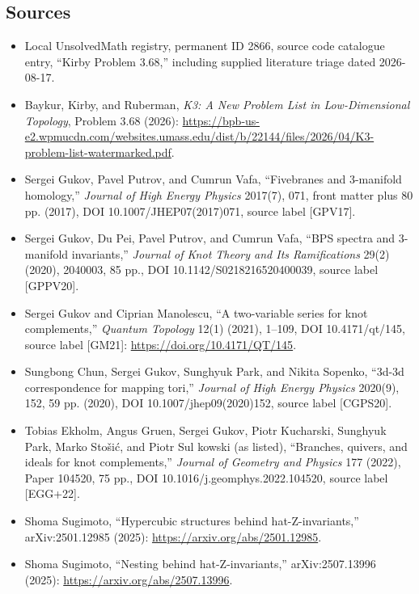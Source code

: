 \documentclass[11pt]{article}
\begin{document}
\subsection{Sources}
\begin{itemize}
\item Local UnsolvedMath registry, permanent ID 2866, source code catalogue entry, ``Kirby Problem 3.68,'' including supplied literature triage dated 2026-08-17.
\item Baykur, Kirby, and Ruberman, \emph{K3: A New Problem List in Low-Dimensional Topology}, Problem 3.68 (2026): \url{https://bpb-us-e2.wpmucdn.com/websites.umass.edu/dist/b/22144/files/2026/04/K3-problem-list-watermarked.pdf}.
\item Sergei Gukov, Pavel Putrov, and Cumrun Vafa, ``Fivebranes and 3-manifold homology,'' \emph{Journal of High Energy Physics} 2017(7), 071, front matter plus 80 pp. (2017), DOI 10.1007/JHEP07(2017)071, source label [GPV17].
\item Sergei Gukov, Du Pei, Pavel Putrov, and Cumrun Vafa, ``BPS spectra and 3-manifold invariants,'' \emph{Journal of Knot Theory and Its Ramifications} 29(2) (2020), 2040003, 85 pp., DOI 10.1142/S0218216520400039, source label [GPPV20].
\item Sergei Gukov and Ciprian Manolescu, ``A two-variable series for knot complements,'' \emph{Quantum Topology} 12(1) (2021), 1--109, DOI 10.4171/qt/145, source label [GM21]: \url{https://doi.org/10.4171/QT/145}.
\item Sungbong Chun, Sergei Gukov, Sunghyuk Park, and Nikita Sopenko, ``3d-3d correspondence for mapping tori,'' \emph{Journal of High Energy Physics} 2020(9), 152, 59 pp. (2020), DOI 10.1007/jhep09(2020)152, source label [CGPS20].
\item Tobias Ekholm, Angus Gruen, Sergei Gukov, Piotr Kucharski, Sunghyuk Park, Marko Sto\v{s}i\'c, and Piotr Sul kowski (as listed), ``Branches, quivers, and ideals for knot complements,'' \emph{Journal of Geometry and Physics} 177 (2022), Paper 104520, 75 pp., DOI 10.1016/j.geomphys.2022.104520, source label [EGG+22].
\item Shoma Sugimoto, ``Hypercubic structures behind hat-Z-invariants,'' arXiv:2501.12985 (2025): \url{https://arxiv.org/abs/2501.12985}.
\item Shoma Sugimoto, ``Nesting behind hat-Z-invariants,'' arXiv:2507.13996 (2025): \url{https://arxiv.org/abs/2507.13996}.
\end{itemize}
\end{document}
